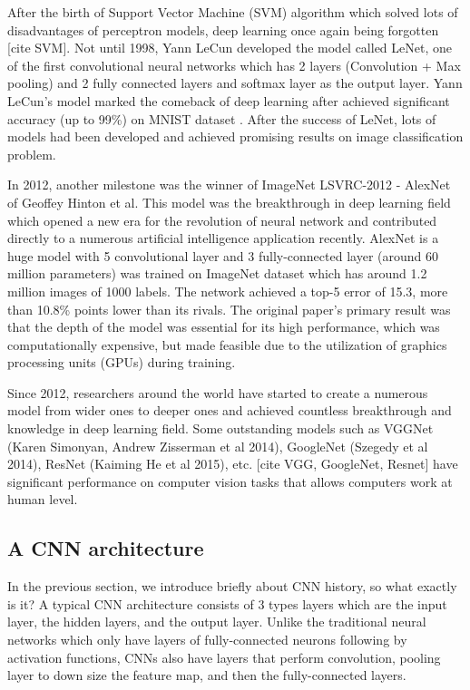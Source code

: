 	After the birth of Support Vector Machine (SVM) algorithm which solved lots of disadvantages of perceptron models, deep learning once again being forgotten [cite SVM]. Not until 1998, Yann LeCun developed the model called LeNet, one of the first convolutional neural networks which has 2 layers (Convolution + Max pooling) and 2 fully connected layers and softmax layer as the output layer. Yann LeCun’s model marked the comeback of deep learning after achieved significant accuracy (up to 99\%) on MNIST dataset \cite{lenet}. After the success of LeNet, lots of models had been developed and achieved promising results on image classification problem.
	
	In 2012, another milestone was the winner of ImageNet LSVRC-2012 - AlexNet of Geoffey Hinton et al. This model was the breakthrough in deep learning field which opened a new era for the revolution of neural network and contributed directly to a numerous artificial intelligence application recently. AlexNet is a huge model with 5 convolutional layer and 3 fully-connected layer (around 60 million parameters) was trained on ImageNet dataset which has around 1.2 million images of 1000 labels. The network achieved a top-5 error of 15.3, more than 10.8\% points lower than its rivals. The original paper's primary result was that the depth of the model was essential for its high performance, which was computationally expensive, but made feasible due to the utilization of graphics processing units (GPUs) during training.

	Since 2012, researchers around the world have started to create a numerous model from wider ones to deeper ones and achieved countless breakthrough and knowledge in deep learning field. Some outstanding models such as VGGNet (Karen Simonyan, Andrew Zisserman et al 2014), GoogleNet (Szegedy et al 2014), ResNet (Kaiming He et al 2015), etc. [cite VGG, GoogleNet, Resnet] have significant performance on computer vision tasks that allows computers work at human level.

\subsection{A CNN architecture}

\noindent

	In the previous section, we introduce briefly about CNN history, so what exactly is it? A typical CNN architecture consists of 3 types layers which are the input layer, the hidden layers, and the output layer. Unlike the traditional neural networks which only have layers of fully-connected neurons following by activation functions, CNNs also have layers that perform convolution, pooling layer to down size the feature map, and then the fully-connected layers.
	
